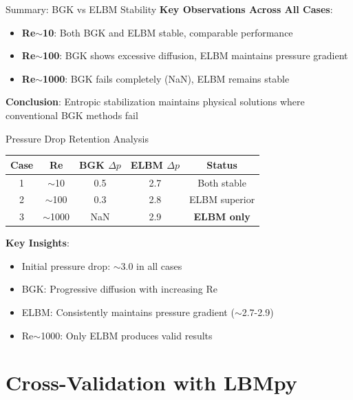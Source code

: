 \documentclass[aspectratio=169]{beamer}
\begin{document}
\begin{frame}{Summary: BGK vs ELBM Stability}
\textbf{Key Observations Across All Cases}:
\begin{itemize}
    \item \textbf{Re$\sim$10}: Both BGK and ELBM stable, comparable performance
    \item \textbf{Re$\sim$100}: BGK shows excessive diffusion, ELBM maintains pressure gradient
    \item \textbf{Re$\sim$1000}: BGK fails completely (NaN), ELBM remains stable
\end{itemize}

\vspace{0.3cm}
\textbf{Conclusion}: Entropic stabilization maintains physical solutions where conventional BGK methods fail
\end{frame}

\begin{frame}{Pressure Drop Retention Analysis}
\begin{table}
\centering
\begin{tabular}{ccccc}
\toprule
\textbf{Case} & \textbf{Re} & \textbf{BGK $\Delta p$} & \textbf{ELBM $\Delta p$} & \textbf{Status} \\
\midrule
1 & $\sim$10 & 0.5 & 2.7 & Both stable \\
2 & $\sim$100 & 0.3 & 2.8 & ELBM superior \\
3 & $\sim$1000 & NaN & 2.9 & \textbf{ELBM only} \\
\bottomrule
\end{tabular}
\end{table}

\vspace{0.5cm}
\textbf{Key Insights}:
\begin{itemize}
    \item Initial pressure drop: $\sim$3.0 in all cases
    \item BGK: Progressive diffusion with increasing Re
    \item ELBM: Consistently maintains pressure gradient ($\sim$2.7-2.9)
    \item Re$\sim$1000: Only ELBM produces valid results
\end{itemize}
\end{frame}

\section{Cross-Validation with LBMpy}
\end{document}
